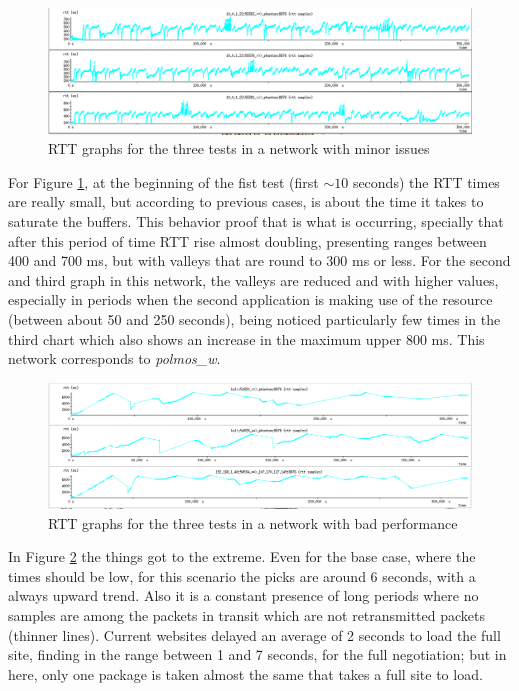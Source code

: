 \begin{figure}[ht]
\centering
    \includegraphics[width=\textwidth]{img/n_iperf_mid}
\caption[Iperf: RTT graphs for a network with minor issues]{RTT graphs for the three tests in a network with minor issues}
\label{fig:iperfmid}
\end{figure}%


For Figure \ref{fig:iperfmid}, at the beginning of the fist test (first $\sim10$ seconds) the RTT times are really small, but according to previous cases, is about the time it takes to saturate the buffers. This behavior proof that is what is occurring, specially that after this period of time RTT rise almost doubling, presenting ranges between 400 and 700 ms, but with valleys that are round to  300 ms or less. For the second and third graph in this network, the valleys are reduced and with higher values, especially in periods when the second application is making use of the resource (between about 50 and 250 seconds), being noticed particularly few times in the third chart which also shows an increase in the maximum upper 800 ms. This network corresponds to \emph{polmos\_w}.

\begin{figure}[ht]
\centering
    \includegraphics[width=\textwidth]{img/n_iperf_bad}
\caption[Iperf: RTT graphs for a network with bad performance]{RTT graphs for the three tests in a network with bad performance}
\label{fig:iperfbad}
\end{figure}%

In Figure \ref{fig:iperfbad} the things got to the extreme. Even for the base
case, where the times should be low, for this scenario the picks are around 6
seconds, with a always upward trend. Also it is a constant presence of long
periods where no samples are among the packets in transit which are not
retransmitted packets (thinner lines). Current websites delayed an average of 2
seconds to load the full site, finding in the range between 1 and 7 seconds,
for the full negotiation; but in here, only one package is taken almost the
same that takes a full site to load.

